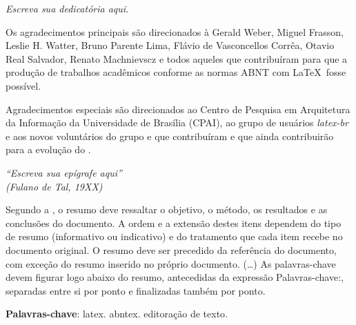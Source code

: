 \documentclass[
	12pt,				%
	openright,			%
	oneside,			%
	a4paper,			%
	english,			%
	brazil				%
	]{abntex2}
\begin{document}
\begin{dedicatoria}
   \vspace*{\fill}
   \centering
   \noindent
   \textit{ Escreva sua dedicatória aqui.} \vspace*{\fill}
\end{dedicatoria}

\begin{agradecimentos}
Os agradecimentos principais são direcionados à Gerald Weber, Miguel Frasson,
Leslie H. Watter, Bruno Parente Lima, Flávio de Vasconcellos Corrêa, Otavio Real
Salvador, Renato Machnievscz e todos aqueles que
contribuíram para que a produção de trabalhos acadêmicos conforme
as normas ABNT com \LaTeX\ fosse possível.

Agradecimentos especiais são direcionados ao Centro de Pesquisa em Arquitetura
da Informação da Universidade de
Brasília (CPAI), ao grupo de usuários
\emph{latex-br} e aos
novos voluntários do grupo
\emph{\abnTeX} e que contribuíram e que ainda
contribuirão para a evolução do \abnTeX.

\end{agradecimentos}

\begin{epigrafe}
    \vspace*{\fill}
	\begin{flushright}
		\textit{``Escreva sua epígrafe aqui''\\
		(Fulano de Tal, 19XX)}
	\end{flushright}
\end{epigrafe}


\setlength{\absparsep}{18pt} %
\begin{resumo}
 Segundo a \cite{NBR6028:2003}, o resumo deve ressaltar o
 objetivo, o método, os resultados e as conclusões do documento. A ordem e a extensão
 destes itens dependem do tipo de resumo (informativo ou indicativo) e do
 tratamento que cada item recebe no documento original. O resumo deve ser
 precedido da referência do documento, com exceção do resumo inserido no
 próprio documento. (\ldots) As palavras-chave devem figurar logo abaixo do
 resumo, antecedidas da expressão Palavras-chave:, separadas entre si por
 ponto e finalizadas também por ponto.

 \textbf{Palavras-chave}: latex. abntex. editoração de texto.
\end{resumo}
\end{document}
